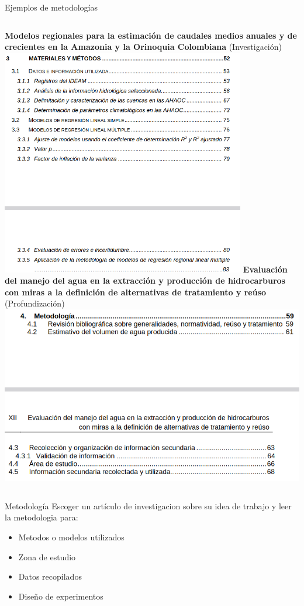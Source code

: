 \documentclass[
10pt,
aspectratio=169,
]{beamer}
\begin{document}
\begin{frame}{Ejemplos de metodologías}
\begin{columns}
\textbf{Modelos regionales para la estimación de caudales medios anuales y de crecientes en la Amazonia y la Orinoquia Colombiana} (\alert{Investigaci\'on})
\centering
\includegraphics[width=0.8\textwidth]{metof1.png}
\textbf{Evaluación del manejo del agua en la extracción y producción de hidrocarburos con miras a la definición de alternativas de tratamiento y reúso} (\alert{Profundizaci\'on})
\centering
\includegraphics[width=\textwidth]{metof2.png}
\end{columns}
\end{frame}


\begin{frame}{Metodolog\'ia}
Escoger un art\'iculo de investigacion sobre su idea de trabajo y leer la metodologia para:
\begin{itemize}
\item Metodos o modelos utilizados
\item Zona de estudio
\item Datos recopilados
\item Diseño de experimentos
\end{itemize}
\end{frame}
\end{document}
